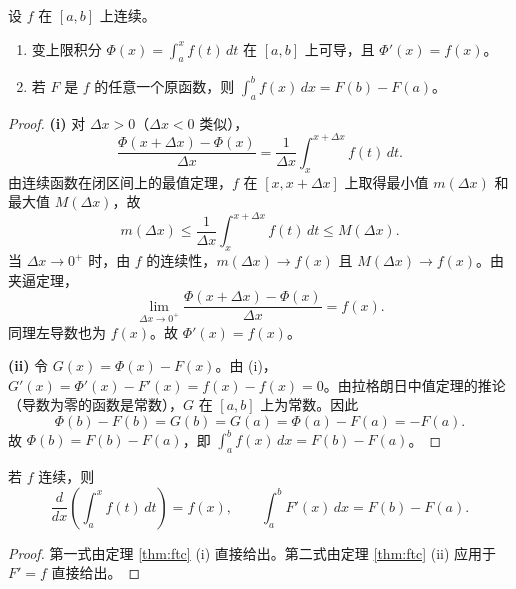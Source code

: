 \begin{theorem}\label{thm:ftc}
设 $f$ 在 $[a,b]$ 上连续。
\begin{enumerate}[label=(\roman*)]
    \item 变上限积分 $\Phi(x) = \int_a^x f(t)\,dt$ 在 $[a,b]$ 上可导，且 $\Phi'(x) = f(x)$。
    \item 若 $F$ 是 $f$ 的任意一个原函数，则 $\int_a^b f(x)\,dx = F(b) - F(a)$。
\end{enumerate}
\end{theorem}

\begin{proof}
\textbf{(i)} 对 $\Delta x > 0$（$\Delta x < 0$ 类似），
\[
\frac{\Phi(x+\Delta x) - \Phi(x)}{\Delta x} = \frac{1}{\Delta x}\int_x^{x+\Delta x} f(t)\,dt.
\]
由连续函数在闭区间上的最值定理，$f$ 在 $[x, x+\Delta x]$ 上取得最小值 $m(\Delta x)$ 和最大值 $M(\Delta x)$，故
\[
m(\Delta x) \le \frac{1}{\Delta x}\int_x^{x+\Delta x} f(t)\,dt \le M(\Delta x).
\]
当 $\Delta x \to 0^+$ 时，由 $f$ 的连续性，$m(\Delta x) \to f(x)$ 且 $M(\Delta x) \to f(x)$。由夹逼定理，
\[
\lim_{\Delta x \to 0^+} \frac{\Phi(x+\Delta x) - \Phi(x)}{\Delta x} = f(x).
\]
同理左导数也为 $f(x)$。故 $\Phi'(x) = f(x)$。

\textbf{(ii)} 令 $G(x) = \Phi(x) - F(x)$。由 (i)，$G'(x) = \Phi'(x) - F'(x) = f(x) - f(x) = 0$。由拉格朗日中值定理的推论（导数为零的函数是常数），$G$ 在 $[a,b]$ 上为常数。因此
\[
\Phi(b) - F(b) = G(b) = G(a) = \Phi(a) - F(a) = -F(a).
\]
故 $\Phi(b) = F(b) - F(a)$，即 $\int_a^b f(x)\,dx = F(b) - F(a)$。
\end{proof}

\begin{corollary}[微分与积分的互逆性]\label{cor:diff_int_inverse}
若 $f$ 连续，则
\[\frac{d}{dx}\left( \int_a^x f(t)\,dt \right) = f(x),\qquad
\int_a^b F'(x)\,dx = F(b) - F(a).\]
\end{corollary}

\begin{proof}
第一式由定理 \ref{thm:ftc} (i) 直接给出。第二式由定理 \ref{thm:ftc} (ii) 应用于 $F' = f$ 直接给出。
\end{proof}

